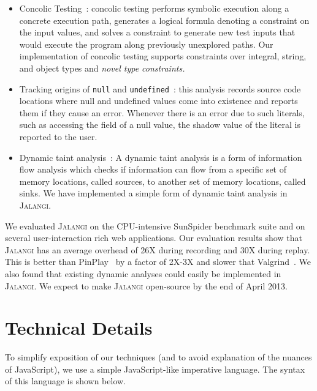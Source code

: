 \documentclass{sig-alternate}
\def\jalangi{\textsc{Jalangi}}
\begin{document}
\begin{itemize}
\item Concolic Testing~\cite{dart,cute}: concolic testing performs
  symbolic execution along a concrete execution path, generates a
  logical formula denoting a constraint on the input values, and
  solves a constraint to generate new test inputs that would execute
  the program along previously unexplored paths.  Our implementation
  of concolic testing supports constraints over integral, string, and
  object types and \emph{novel type constraints.}
\item Tracking origins of \texttt{null} and
  \texttt{undefined}~\cite{Bond:2007:TBA:1297027.1297057}: this
  analysis records source code locations where null and undefined
  values come into existence and reports them if they cause an error.
  Whenever there is an error due to such literals, such as accessing
  the field of a null value, the shadow value of the literal is
  reported to the user.
\item Dynamic taint
  analysis~\cite{songndss05,Clause:2007:DGD:1273463.1273490}: A
  dynamic taint analysis is a form of information flow analysis which
  checks if information can flow from a specific set of memory
  locations, called sources, to another set of memory locations,
  called sinks.  We have implemented a simple form of dynamic taint
  analysis in \jalangi{}.
\end{itemize}

We evaluated \jalangi{} on the CPU-intensive SunSpider benchmark suite
and on several user-interaction rich web applications.  Our evaluation
results show that \jalangi{} has an average overhead of 26X during
recording and 30X during replay.  This is better than
PinPlay~\cite{Patil:2010:PFD:1772954.1772958} by a factor of 2X-3X and
slower that Valgrind~\cite{Nethercote:2007:VFH:1250734.1250746}.  We
also found that existing dynamic analyses could easily be implemented
in \jalangi{}.  We expect to make \jalangi{} open-source by the end of
April 2013.


\section{Technical Details}
\label{sec:technical-details}

To simplify exposition of our techniques (and to avoid explanation of
the nuances of JavaScript), we use a simple JavaScript-like imperative
language.  The syntax of this language is shown below.
\end{document}
